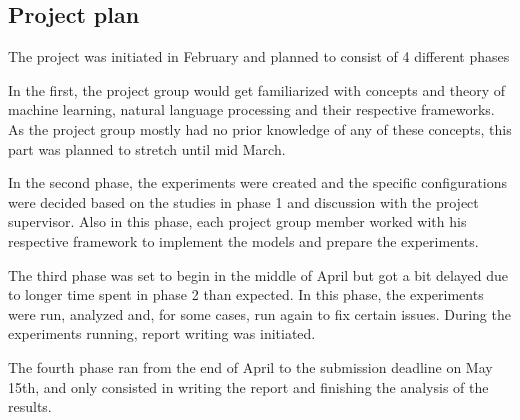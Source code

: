 \subsection{Project plan}

The project was initiated in February and planned to consist of 4 different
phases

In the first, the project group would get familiarized with concepts and theory
of machine learning, natural language processing and their respective
frameworks. As the project group mostly had no prior knowledge of any of these
concepts, this part was planned to stretch until mid March.

In the second phase, the experiments were created and the specific
configurations were decided based on the studies in phase 1 and discussion with
the project supervisor. Also in this phase, each project group member worked
with his respective framework to implement the models and prepare the
experiments.

The third phase was set to begin in the middle of April but got a bit delayed
due to longer time spent in phase 2 than expected. In this phase, the
experiments were run, analyzed and, for some cases, run again to fix certain
issues. During the experiments running, report writing was initiated.

The fourth phase ran from the end of April to the submission deadline on May
15th, and only consisted in writing the report and finishing the analysis of the
results.


\pagebreak
